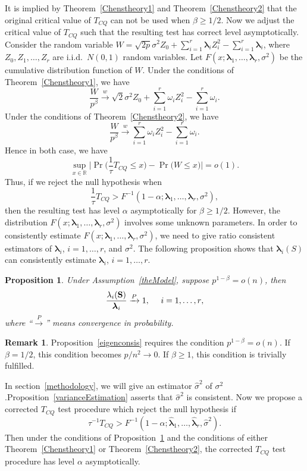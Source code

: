 \documentclass[review]{elsarticle}
\newcommand{\bfsym}[1]{\ensuremath{\boldsymbol{#1}}}
\def\blambda {\bfsym {\lambda}}        \def\bLambda {\bfsym {\Lambda}}
\theoremstyle{plain}
\newtheorem{proposition}{\quad\quad Proposition}
\theoremstyle{definition}
\newtheorem{remark}{\quad\quad Remark}
\theoremstyle{remark}
\begin{document}
It is implied by Theorem~\ref{Chenstheory1} and Theorem~\ref{Chenstheory2} that the original critical value of $T_{CQ}$ can not be used when $\beta\geq 1/2$.
Now we adjust the critical value of $T_{CQ}$ such that the resulting test has correct level asymptotically.
Consider the random variable
$
W=
\sqrt{2p}\sigma^2 Z_0
+
        \sum_{i=1}^r \blambda_i Z_i^2
            -
        \sum_{i=1}^r \blambda_i
        $, 
where $Z_0,Z_1,\ldots,Z_r$ are i.i.d.\ $N(0,1)$ random variables.
Let $F(x;\blambda_1,\ldots,\blambda_r,\sigma^2)$ be the cumulative distribution function of $W$.
Under the conditions of Theorem~\ref{Chenstheory1}, we have
$$
\frac{W}{p^{\beta}}\xrightarrow{w}
\sqrt{2}\sigma^2 Z_0 + \sum_{i=1}^r \omega_i Z_i^2 -\sum_{i=1}^r \omega_i.
$$
Under the conditions of Theorem~\ref{Chenstheory2}, we have
$$
\frac{W}{p^{\beta}}\xrightarrow{w}
\sum_{i=1}^r \omega_i Z_i^2 -\sum_{i=1}^r \omega_i.
$$
Hence in both case, we have
$$
\sup_{x\in\mathbb{R}}\big|\Pr\big(\frac{1}{\tau}T_{CQ}\leq x\big)-\Pr\big(W\leq x\big)\big|
=o(1).
$$
Thus, if we reject the null hypothesis when
$$
\frac{1}{\tau}T_{CQ}>
F^{-1}(1-\alpha;\blambda_1,\ldots,\blambda_r,\sigma^2),
$$
then the resulting test has level $\alpha$ asymptotically for $\beta\geq 1/2$.
        However, the distribution $F(x;\blambda_1,\ldots,\blambda_r,\sigma^2)$ involves some unknown parameters.
In order to consistently estimate $F(x;\blambda_1,\ldots,\blambda_r,\sigma^2)$, we need to give ratio consistent estimators of $\blambda_i$, $i=1,\ldots,r$, and $\sigma^2$.
The following proposition shows that  $\blambda_i(S)$ can consistently estimate $\blambda_i$, $i=1,\ldots,r$.
\begin{proposition}\label{eigenconsis}
    Under Assumption~\ref{theModel}, suppose $p^{1-\beta}=o(n)$, then
    $$
    \frac{\lambda_i(\BS)}{\blambda_i}\xrightarrow{P}1,\quad\text{ $i=1,\ldots,r$},
    $$
    where ``$\xrightarrow{P}$'' means convergence in probability.
\end{proposition}
\begin{remark}
    Proposition~\eqref{eigenconsis} requires the condition $p^{1-\beta}=o(n)$.
    If $\beta=1/2$, this condition becomes $p/n^2\to 0$.
    If $\beta\geq 1$, this condition is trivially fulfilled.
\end{remark}
In section~\ref{methodology}, we will give an estimator $\hat{\sigma}^2$ of $\sigma^2$.Proposition~\ref{varianceEstimation} asserts that $\hat{\sigma}^2$ is consistent. 
Now we propose a corrected $T_{CQ}$ test procedure which reject the null hypothesis if
$$
\tau^{-1}{T_{CQ}}> F^{-1}(1-\alpha;\hat{\blambda}_1,\ldots,\hat{\blambda}_r,\hat{\sigma}^2).
$$
Then under the conditions of Proposition~\ref{eigenconsis} and the conditions of either Theorem~\ref{Chenstheory1} or Theorem~\ref{Chenstheory2}, the corrected $T_{CQ}$ test procedure has level $\alpha$ asymptotically.
\end{document}

